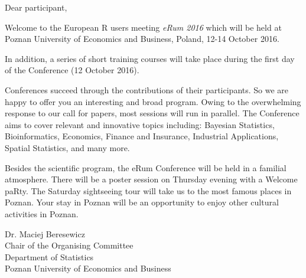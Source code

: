 Dear participant,

Welcome to the European R users meeting \textit{eRum 2016} which will be held at Poznan University of Economics and Business, Poland, 12-14 October 2016.

In addition, a series of short training courses will take place during the first day of the Conference (12 October 2016).

Conferences succeed through the contributions of their participants. So we are happy to offer you an interesting and broad program. Owing to the overwhelming response to our call for papers, most sessions will run in parallel. The Conference aims to cover relevant and innovative topics including: Bayesian Statistics, Bioinformatics, Economics, Finance and Insurance, Industrial Applications, Spatial Statistics, and many more.

Besides the scientific program, the eRum Conference will be held in a familial atmosphere. There will be a poster session on Thursday evening with a Welcome paRty. The Saturday sightseeing tour will take us to the most famous places in Poznan. Your stay in Poznan will be an opportunity to enjoy other cultural activities in Poznan.

\vspace{1.5cm}

\begin{flushleft}
Dr. Maciej Beresewicz \\
\vspace{0.5cm}
Chair of the Organising Committee \\ 
Department of Statistics \\ 
Poznan University of Economics and Business
\end{flushleft}
